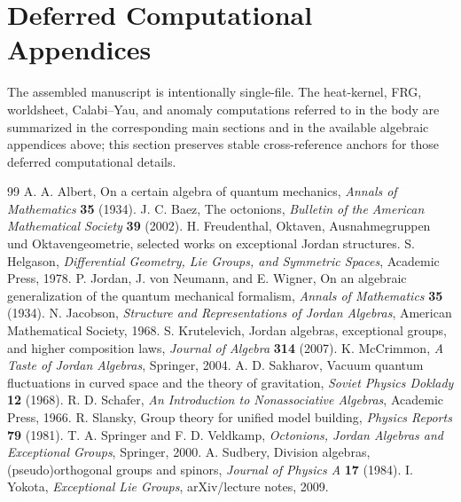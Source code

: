 \documentclass[11pt]{article}
\theoremstyle{plain}
\theoremstyle{definition}
\theoremstyle{remark}
\begin{document}
\section{Deferred Computational Appendices}
\label{app:gravity:main}
\label{app:frg}
\label{app:ws:main}
\label{app:cy:main}
\label{app:anomaly:main}
\label{eq:MC}
\label{eq:sigma}
The assembled manuscript is intentionally single-file. The heat-kernel, FRG, worldsheet, Calabi--Yau, and anomaly computations referred to in the body are summarized in the corresponding main sections and in the available algebraic appendices above; this section preserves stable cross-reference anchors for those deferred computational details.

\begin{thebibliography}{99}
 A. A. Albert, On a certain algebra of quantum mechanics, \emph{Annals of Mathematics} \textbf{35} (1934).
 J. C. Baez, The octonions, \emph{Bulletin of the American Mathematical Society} \textbf{39} (2002).
 H. Freudenthal, Oktaven, Ausnahmegruppen und Oktavengeometrie, selected works on exceptional Jordan structures.
 S. Helgason, \emph{Differential Geometry, Lie Groups, and Symmetric Spaces}, Academic Press, 1978.
 P. Jordan, J. von Neumann, and E. Wigner, On an algebraic generalization of the quantum mechanical formalism, \emph{Annals of Mathematics} \textbf{35} (1934).
 N. Jacobson, \emph{Structure and Representations of Jordan Algebras}, American Mathematical Society, 1968.
 S. Krutelevich, Jordan algebras, exceptional groups, and higher composition laws, \emph{Journal of Algebra} \textbf{314} (2007).
 K. McCrimmon, \emph{A Taste of Jordan Algebras}, Springer, 2004.
 A. D. Sakharov, Vacuum quantum fluctuations in curved space and the theory of gravitation, \emph{Soviet Physics Doklady} \textbf{12} (1968).
 R. D. Schafer, \emph{An Introduction to Nonassociative Algebras}, Academic Press, 1966.
 R. Slansky, Group theory for unified model building, \emph{Physics Reports} \textbf{79} (1981).
 T. A. Springer and F. D. Veldkamp, \emph{Octonions, Jordan Algebras and Exceptional Groups}, Springer, 2000.
 A. Sudbery, Division algebras, (pseudo)orthogonal groups and spinors, \emph{Journal of Physics A} \textbf{17} (1984).
 I. Yokota, \emph{Exceptional Lie Groups}, arXiv/lecture notes, 2009.
\end{thebibliography}
\end{document}
